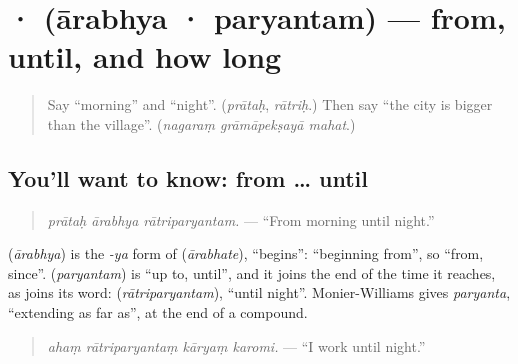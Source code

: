 \section[\texorpdfstring{\sk{आरभ्य} · \sk{पर्यन्तम्} (ārabhya · paryantam)}{आरभ्य · पर्यन्तम् (ārabhya · paryantam)}]{ ·  (ārabhya · paryantam) — from, until, and how long}

\label{lesson:SA-C283-arabhya-paryantam}



\begin{quote}
Say \textquotedblleft{}morning\textquotedblright{} and \textquotedblleft{}night\textquotedblright{}. (\emph{prātaḥ}, \emph{rātriḥ}.) Then say \textquotedblleft{}the city is bigger than the village\textquotedblright{}. (\emph{nagaraṃ grāmāpekṣayā mahat}.)
\end{quote}

\subsection*{You'll want to know: from … until}
\begin{quote}
\textbf{  }
\end{quote}

\begin{quote}
\emph{prātaḥ ārabhya rātriparyantam.} — \textquotedblleft{}From morning until night.\textquotedblright{}
\end{quote}

\textbf{} (\emph{ārabhya}) is the \emph{-ya} form of \textbf{} (\emph{ārabhate}), \textquotedblleft{}begins\textquotedblright{}: \textquotedblleft{}beginning from\textquotedblright{}, so \textquotedblleft{}from, since\textquotedblright{}. \textbf{} (\emph{paryantam}) is \textquotedblleft{}up to, until\textquotedblright{}, and it joins the end of the time it reaches, as \textbf{} joins its word: \textbf{} (\emph{rātriparyantam}), \textquotedblleft{}until night\textquotedblright{}. Monier-Williams gives \emph{paryanta}, \textquotedblleft{}extending as far as\textquotedblright{}, at the end of a compound.

\begin{quote}
\textbf{   }
\end{quote}

\begin{quote}
\emph{ahaṃ rātriparyantaṃ kāryaṃ karomi.} — \textquotedblleft{}I work until night.\textquotedblright{}
\end{quote}

